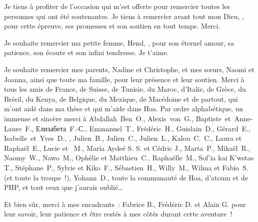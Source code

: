  Je tiens à profiter de l'occasion qui m'est
offerte pour remercier toutes les personnes qui ont été soutenantes. Je tiens à
remercier avant tout mon Dieu, , pour cette épreuve,
ses promesses et son soutien en tout temps. Merci.

Je souhaite remercier ma petite femme, Hend, , pour son
éternel amour, sa patience, son écoute et son infini tendresse. Je t'aime.

Je souhaite remercier mes parents, Nadine et Christophe, et mes sœurs, Naomi et
Joanna, ainsi que toute ma famille, pour leur présence et leur soutien.
%
Merci à tous les amis de France, de Suisse, de Tunisie, du Maroc, d'Italie, de
Grèce, du Brésil, du Kenya, de Belgique, du Mexique, de Macédoine et de partout,
qui m'ont aidé dans ma thèse et qui m'aide dans Hoa. Par ordre alphabétique, un
immense et sincère merci à
Abdallah~Ben~O.,
Alexis~von~G.,
Baptiste~et~Anne-Laure~F.,
\foreignlanguage{russian}{Елизабета}~F.-\foreignlanguage{russian}{С}.,
Emmanuel~T.,
Frédéric~H.,
Guislain~D.,
Gérard~E.,
Isabelle~et~Yves~D.,
,
Julien~B.,
Julien~C.,
Julien~L.,
Kalou~C.~C.,
Laura et Raphaël~E.,
Lucie et ~M.,
\foreignlanguage{spanish}{María Aydeé} S. S. et Cédric J.,
Marta~P.,
Mikaël~R.,
\foreignlanguage{english}{Naomy~W.},
Nawo~M.,
Ophélie et Matthieu~C.,
Raphaëlle~M.,
\foreignlanguage{greek}{\textgreek{Sof'ia kai K'wstas T.}},
Stéphane~P.,
Sylvie et Kiko~F.,
Sébastien~H.,
Willy~M.,
Wilma et \foreignlanguage{italian}{Fabio}~S. (et toute la troupe~!),
Yohann~D.,
toute la communauté de Hoa, d'atoum et de PHP,
et tout ceux que j'aurais oublié…

Et bien sûr, merci à mes encadrants~: Fabrice B., Frédéric D. et Alain G. pour
leur savoir, leur patience et être restés à mes côtés durant cette aventure~!

